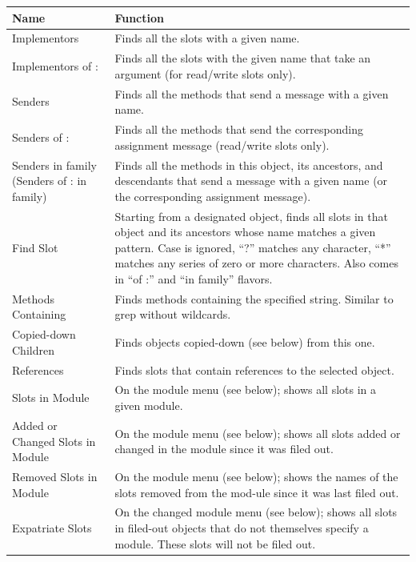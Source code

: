 \documentclass[letterpaper,10pt,english]{sphinxmanual}
\begin{document}
\begin{tabulary}{\linewidth}{|L|L|}
\hline
\textbf{
Name
} & \textbf{
Function
}\\\hline

Implementors
 & 
Finds all the slots with a given name.
\\\hline

Implementors of :
 & 
Finds all the slots with the given name that take an argument (for read/write slots only).
\\\hline

Senders
 & 
Finds all the methods that send a message with a given name.
\\\hline

Senders of :
 & 
Finds all the methods that send the corresponding assignment message (read/write slots only).
\\\hline

Senders in family (Senders of : in family)
 & 
Finds all the methods in this object, its ancestors, and descendants that send a message with a given name (or the corresponding assignment message).
\\\hline

Find Slot
 & 
Starting from a designated object, finds all slots in that object and its ancestors whose name matches a given pattern. Case is ignored, “?” matches any character, “*” matches any series of zero or more characters. Also comes in “of :” and “in family” flavors.
\\\hline

Methods Containing
 & 
Finds methods containing the specified string. Similar to grep without wildcards.
\\\hline

Copied-down Children
 & 
Finds objects copied-down (see below) from this one.
\\\hline

References
 & 
Finds slots that contain references to the selected object.
\\\hline

Slots in Module
 & 
On the module menu (see below); shows all slots in a given module.
\\\hline

Added or Changed Slots in Module
 & 
On the module menu (see below); shows all slots added or changed in the module since it was filed out.
\\\hline

Removed Slots in Module
 & 
On the module menu (see below); shows the names of the slots removed from the mod-ule since it was last filed out.
\\\hline

Expatriate Slots
 & 
On the changed module menu (see below); shows all slots in filed-out objects that do not themselves specify a module. These slots will not be filed out.
\\\hline
\end{tabulary}
\end{document}
